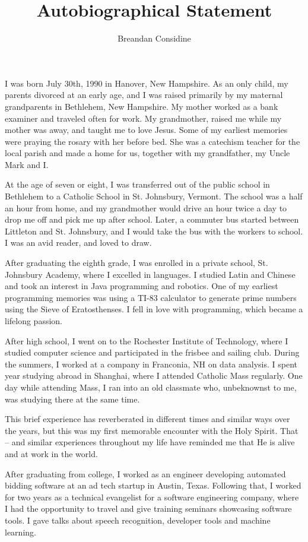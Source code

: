 \documentclass[11pt]{article}
\title{Autobiographical Statement}
\author{Breandan Considine}
\begin{document}
\maketitle
I was born July 30th, 1990 in Hanover, New Hampshire. As an only child, my parents divorced at an early age, and I was raised primarily by my maternal grandparents in Bethlehem, New Hampshire. My mother worked as a bank examiner and traveled often for work. My grandmother, raised me while my mother was away, and taught me to love Jesus. Some of my earliest memories were praying the rosary with her before bed. She was a catechism teacher for the local parish and made a home for us, together with my grandfather, my Uncle Mark and I.

At the age of seven or eight, I was transferred out of the public school in Bethlehem to a Catholic School in St. Johnsbury, Vermont. The school was a half an hour from home, and my grandmother would drive an hour twice a day to drop me off and pick me up after school. Later, a commuter bus started between Littleton and St. Johnsbury, and I would take the bus with the workers to school. I was an avid reader, and loved to draw.

After graduating the eighth grade, I was enrolled in a private school, St. Johnsbury Academy, where I excelled in languages. I studied Latin and Chinese and took an interest in Java programming and robotics. One of my earliest programming memories was using a TI-83 calculator to generate prime numbers using the Sieve of Eratosthenses. I fell in love with programming, which became a lifelong passion.

After high school, I went on to the Rochester Institute of Technology, where I studied computer science and participated in the frisbee and sailing club. During the summers, I worked at a company in Franconia, NH on data analysis. I spent year studying abroad in Shanghai, where I attended Catholic Mass regularly. One day while attending Mass, I ran into an old classmate who, unbeknownst to me, was studying there at the same time.

This brief experience has reverberated in different times and similar ways over the years, but this was my first memorable encounter with the Holy Spirit. That -- and similar experiences throughout my life have reminded me that He is alive and at work in the world.

After graduating from college, I worked as an engineer developing automated bidding software at an ad tech startup in Austin, Texas. Following that, I worked for two years as a technical evangelist for a software engineering company, where I had the opportunity to travel and give training seminars showcasing software tools. I gave talks about speech recognition, developer tools and machine learning.
\end{document}
